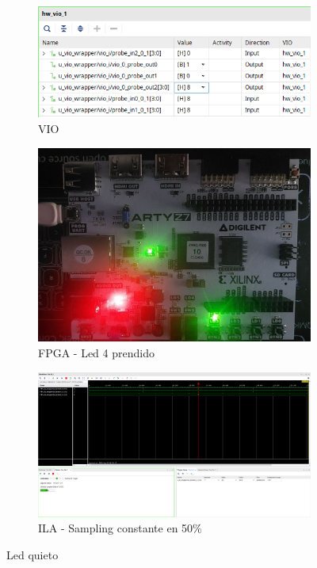 \begin{figure}[H]
    \centering
    \begin{subfigure}{0.4\textwidth}
        \includegraphics[width=\textwidth]{captures/impl_c3_static_vio.png}
        \caption{VIO}
    \end{subfigure}
    \hfill
    \begin{subfigure}{0.4\textwidth}
        \includegraphics[width=\textwidth]{captures/impl_c3_static_fpga.png}
        \caption{FPGA - Led 4 prendido}
    \end{subfigure}
    \vspace{1cm}

    \begin{subfigure}{\textwidth}
        \includegraphics[width=\textwidth]{captures/impl_c3_static_ila.png}
        \caption{ILA - Sampling constante en 50\%}
    \end{subfigure}

    \caption{Led quieto}
\end{figure}

